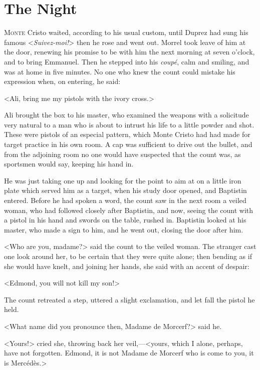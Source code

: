 \chapter{The Night} 

 \lettrine{M}{onte} Cristo waited, according to his usual custom, until Duprez had sung his famous <\textit{Suivez-moi!}> then he rose and went out. Morrel took leave of him at the door, renewing his promise to be with him the next morning at seven o'clock, and to bring Emmanuel. Then he stepped into his \textit{coupé}, calm and smiling, and was at home in five minutes. No one who knew the count could mistake his expression when, on entering, he said: 

 <Ali, bring me my pistols with the ivory cross.> 

 Ali brought the box to his master, who examined the weapons with a solicitude very natural to a man who is about to intrust his life to a little powder and shot. These were pistols of an especial pattern, which Monte Cristo had had made for target practice in his own room. A cap was sufficient to drive out the bullet, and from the adjoining room no one would have suspected that the count was, as sportsmen would say, keeping his hand in. 

 He was just taking one up and looking for the point to aim at on a little iron plate which served him as a target, when his study door opened, and Baptistin entered. Before he had spoken a word, the count saw in the next room a veiled woman, who had followed closely after Baptistin, and now, seeing the count with a pistol in his hand and swords on the table, rushed in. Baptistin looked at his master, who made a sign to him, and he went out, closing the door after him. 

 <Who are you, madame?> said the count to the veiled woman.  The stranger cast one look around her, to be certain that they were quite alone; then bending as if she would have knelt, and joining her hands, she said with an accent of despair: 

 <Edmond, you will not kill my son!> 

 The count retreated a step, uttered a slight exclamation, and let fall the pistol he held. 

 <What name did you pronounce then, Madame de Morcerf?> said he. 

 <Yours!> cried she, throwing back her veil,—<yours, which I alone, perhaps, have not forgotten. Edmond, it is not Madame de Morcerf who is come to you, it is Mercédès.> 

